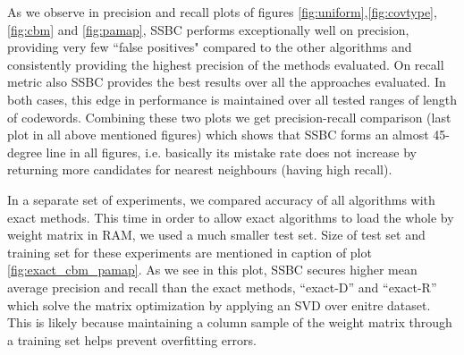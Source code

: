 \documentclass{sig-alternate}
\begin{document}
As we observe in precision and recall plots of figures \ref{fig:uniform},\ref{fig:covtype},\ref{fig:cbm} and \ref{fig:pamap}, SSBC performs exceptionally well on precision, providing very few ``false positives" compared to the other algorithms and consistently providing the highest precision of the methods evaluated. 
On recall metric also SSBC provides the best results over all the approaches evaluated. In both cases, this edge in performance is maintained over all tested ranges of length  of codewords. Combining these two plots we get precision-recall comparison (last plot in all above mentioned figures) which shows that SSBC forms an almost 45-degree line in all figures, i.e. basically its mistake rate does not increase by returning more candidates for nearest neighbours (having high recall).

In a separate set of experiments, we compared accuracy of all algorithms with exact methods. This time in order to allow exact algorithms to load the whole  by  weight matrix in RAM, we used a much smaller test set. Size of test set and training set for these experiments are mentioned in caption of plot \ref{fig:exact_cbm_pamap}.
As we see in this plot, SSBC secures higher mean average precision and recall than the exact methods, ``exact-D'' and ``exact-R'' which solve the matrix optimization by applying an SVD over enitre dataset. This is likely because maintaining a column sample of the weight matrix through a training set helps prevent overfitting errors.


  
\end{document}
